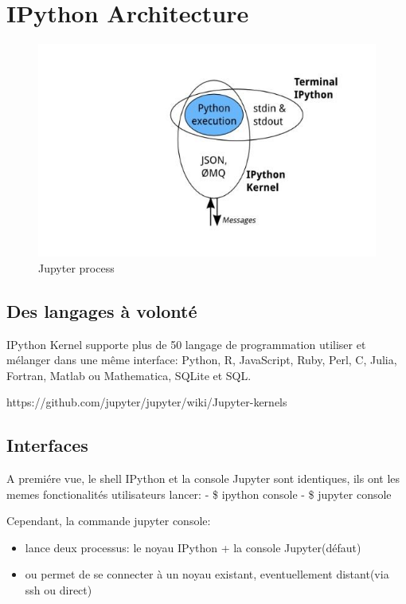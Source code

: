 \documentclass[11pt]{article}
\makeatletter
\def\maxwidth{\ifdim\Gin@nat@width>\linewidth\linewidth
    \else\Gin@nat@width\fi}
\let\Oldincludegraphics\includegraphics
\renewcommand{\includegraphics}[1]{\Oldincludegraphics[width=.8\maxwidth]{#1}}
\providecommand{\tightlist}{%
      \setlength{\itemsep}{0pt}\setlength{\parskip}{0pt}}
\makeatother
\begin{document}
    \section{IPython Architecture}\label{ipython-architecture}

\begin{figure}
\centering
\includegraphics{images/building_custom_kernels_for_ipython.jpg}
\caption{Jupyter process}
\end{figure}

    \subsection{Des langages à volonté}\label{des-langages-uxe0-volontuxe9}

IPython Kernel supporte plus de 50 langage de programmation utiliser et
mélanger dans une même interface: Python, R, JavaScript, Ruby, Perl, C,
Julia, Fortran, Matlab ou Mathematica, SQLite et SQL.

https://github.com/jupyter/jupyter/wiki/Jupyter-kernels

    \subsection{Interfaces}\label{interfaces}

A premiére vue, le shell IPython et la console Jupyter sont identiques,
ils ont les memes fonctionalités utilisateurs lancer: - \$ ipython
console - \$ jupyter console

    Cependant, la commande jupyter console:

\begin{itemize}
\tightlist
\item
  lance deux processus: le noyau IPython + la console Jupyter(défaut)
\item
  ou permet de se connecter à un noyau existant, eventuellement
  distant(via ssh ou direct)
\end{itemize}
\end{document}
